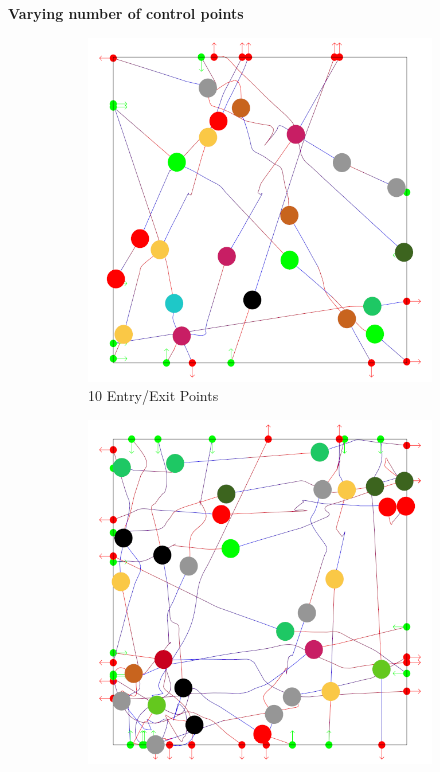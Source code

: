 \textbf{Varying number of control points}

\begin{figure}[t]
 \centering
%
\begin{subfigure}[b]{0.24\linewidth}
	\includegraphics[width=\linewidth]{images/res-10-entry-exit.png}
	\caption{10 Entry/Exit Points}
 \end{subfigure}
%
 \begin{subfigure}[b]{0.24\linewidth}
	\includegraphics[width=\linewidth]{images/res-20-entry-exit.png}

\end{subfigure}
\end{figure}

